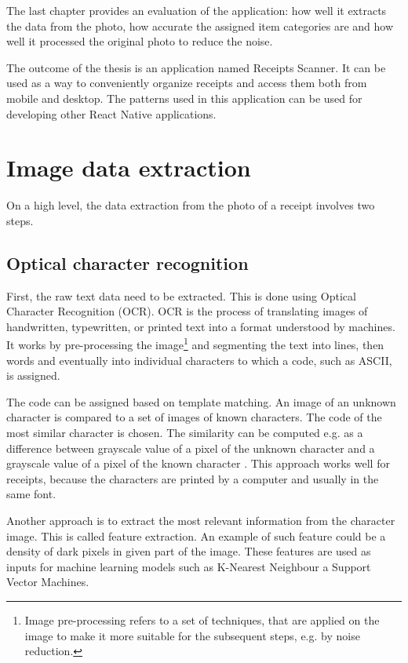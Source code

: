 \documentclass[
  digital, %
  table,   %
  oneside, %
  lof,     %
  lot,     %
]{fithesis3}
\begin{document}
The last chapter provides an evaluation of the application: how well it extracts the data from the photo, how accurate the assigned item categories are and how well it processed the original photo to reduce the noise.

The outcome of the thesis is an application named Receipts Scanner. It can be used as a way to conveniently organize receipts and access them both from mobile and desktop. The patterns used in this application can be used for developing other React Native applications. 

\chapter{Image data extraction}

On a high level, the data extraction from the photo of a receipt involves two steps. 

\section{Optical character recognition}
First, the raw text data need to be extracted. This is done using Optical Character Recognition (OCR). OCR is the process of translating images of handwritten, typewritten, or printed text into a format understood by machines. 
It works by pre-processing the image\footnote{Image pre-processing refers to a set of techniques, that are applied on the image to make it more suitable for the subsequent steps, e.g. by noise reduction.} and segmenting the text into lines, then words and eventually into individual characters to which a code, such as ASCII, is assigned. \cite{OCRCNN}

The code can be assigned based on template matching. An image of an unknown character is compared to a set of images of known characters. The code of the most similar character is chosen. The similarity can be computed e.g. as a difference between grayscale value of a pixel of the unknown character and a grayscale value of a pixel of the known character \cite{Ziegaus2016TemplateMatching}.
This approach works well\cite{Ziegaus2016TemplateMatching} for receipts, because the characters are printed by a computer and usually in the same font. 

Another approach is to extract the most relevant information from the character image. This is called feature extraction. An example of such feature could be a density of dark pixels in given part of the image. These features are used as inputs for machine learning models such as K-Nearest Neighbour a Support Vector Machines. \cite{singh2011feature}
\end{document}
